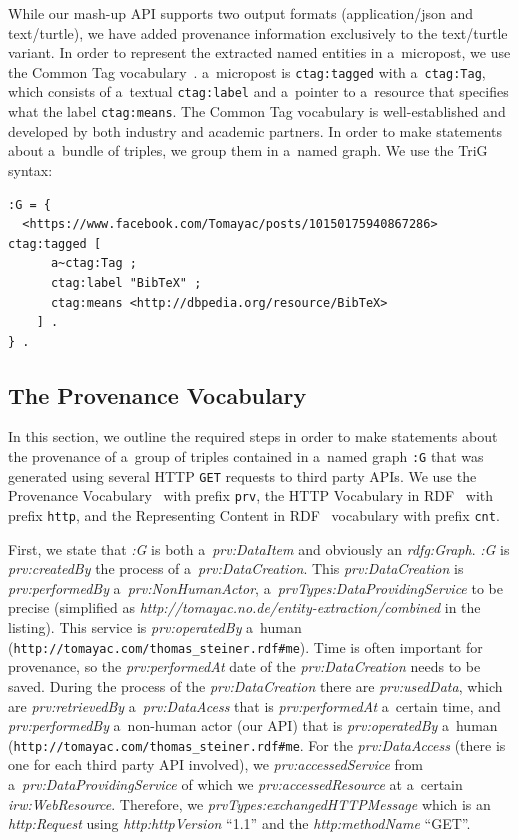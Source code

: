 While our mash-up API supports two output formats (application/json and text/turtle), we have added provenance information exclusively to the text/turtle variant. In order to represent the extracted named entities in a~micropost, we use the Common Tag vocabulary~\cite{CommonTag:Spec}. a~micropost is \texttt{ctag:tagged} with a~\texttt{ctag:Tag}, which consists of a~textual \texttt{ctag:label} and a~pointer to a~resource that specifies what the label \texttt{ctag:means}. The Common Tag vocabulary is well-established and developed by both industry and academic partners. In order to make statements about a~bundle of triples, we group them in a~named graph. We use the TriG~\cite{Bizer:TriG} syntax:

\begin{lstlisting}
:G = {
  <https://www.facebook.com/Tomayac/posts/10150175940867286> ctag:tagged [
      a~ctag:Tag ;
      ctag:label "BibTeX" ;
      ctag:means <http://dbpedia.org/resource/BibTeX>
    ] .
} .
\end{lstlisting}

\subsection{The Provenance Vocabulary}                                      \label{sec:provenance}
In this section, we outline the required steps in order to make statements about the provenance of a~group of triples contained in a~named graph \texttt{:G} that was generated using several HTTP \texttt{GET} requests to third party APIs. We use the Provenance Vocabulary~\cite{Hartig:Provenance} with prefix \texttt{prv}, the HTTP Vocabulary in RDF~\cite{HTTP:RDF} with prefix \texttt{http}, and the Representing Content in RDF~\cite{CNT:RDF} vocabulary with prefix \texttt{cnt}.

First, we state that \emph{:G} is both a~\emph{prv:DataItem} and obviously an \emph{rdfg:Graph}. \emph{:G} is \emph{prv:createdBy} the process of a~\emph{prv:DataCreation}. This \emph{prv:DataCreation} is \emph{prv:performedBy} a~\emph{prv:NonHumanActor}, a~\emph{prvTypes:DataProvidingService} to be precise (simplified as \emph{http://tomayac.no.de/entity-extraction/combined} in the listing). This service is \emph{prv:operatedBy} a~human (\texttt{http://tomayac.com/thomas\_steiner.rdf\#me}). Time is often important for provenance, so the \emph{prv:performedAt} date of the \emph{prv:DataCreation} needs to be saved. During the process of the \emph{prv:DataCreation} there are \emph{prv:usedData}, which are \emph{prv:retrievedBy} a~\emph{prv:DataAcess} that is \emph{prv:performedAt} a~certain time, and \emph{prv:performedBy} a~non-human actor (our API) that is \emph{prv:operatedBy} a~human (\texttt{http://tomayac.com/thomas\_steiner.rdf\#me}. For the \emph{prv:DataAccess} (there is one for each third party API involved), we \emph{prv:accessedService} from a~\emph{prv:DataProvidingService} of which we \emph{prv:accessedResource} at a~certain \emph{irw:WebResource}. Therefore, we \emph{prvTypes:exchangedHTTPMessage} which is an \emph{http:Request} using \emph{http:httpVersion} ``1.1'' and the \emph{http:methodName} ``GET''.

